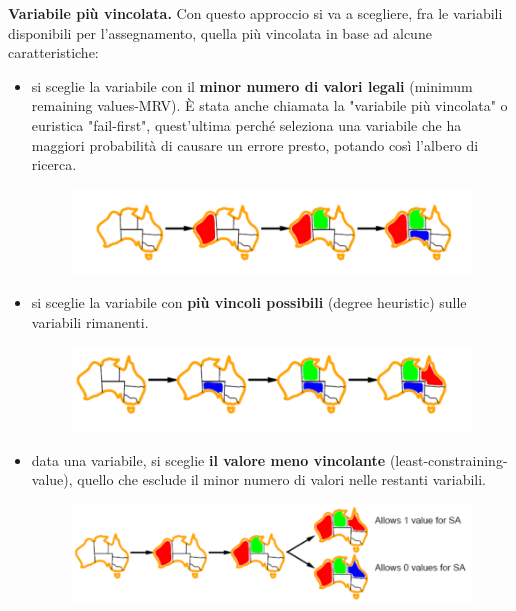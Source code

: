 \textbf{Variabile più vincolata.} Con questo approccio si va a scegliere, fra le variabili disponibili per l’assegnamento, quella più vincolata in base ad alcune caratteristiche:
\begin{itemize}
    \item si sceglie la variabile con il \textbf{minor numero di valori legali} (minimum remaining values-MRV). È stata anche chiamata la "variabile più vincolata" o euristica "fail-first", quest’ultima perché seleziona una variabile che ha maggiori probabilità di causare un errore presto, potando così l’albero di ricerca.
    \begin{figure}[htp]
    	\centering
        \includegraphics[width=12cm, keepaspectratio]{img/Cap2/m1.png}
    \end{figure}
    \item si sceglie la variabile con \textbf{più vincoli possibili} (degree heuristic) sulle variabili rimanenti.
    \begin{figure}[htp]
    	\centering
        \includegraphics[width=12cm, keepaspectratio]{img/Cap2/m2.png}
    \end{figure}
    \item data una variabile, si sceglie \textbf{il valore meno vincolante} (least-constraining-value), quello che esclude il minor numero di valori nelle restanti variabili.
    \begin{figure}[htp]
    	\centering
        \includegraphics[width=12cm, keepaspectratio]{img/Cap2/m3.png}
    \end{figure}
\end{itemize}

